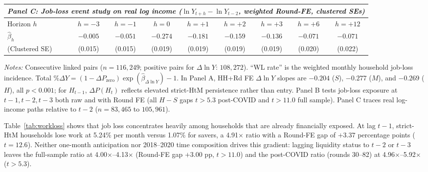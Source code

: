 \documentclass[11pt]{article}
\begin{document}
\begin{table}[tbp]
\medskip
\setlength{\tabcolsep}{4.0pt}
\begin{tabular}{lcccccccc}
\toprule
\multicolumn{9}{l}{\textit{Panel C: Job-loss event study on real log income ($\ln Y_{t+h} - \ln Y_{t-2}$, weighted Round-FE, clustered SEs)}} \\
\midrule
Horizon $h$ & $h=-3$ & $h=-1$ & $h=0$ & $h=+1$ & $h=+2$ & $h=+3$ & $h=+6$ & $h=+12$ \\
\midrule
$\hat{\beta}_h$ & $-0.005$ & $-0.051$ & $-0.274$ & $-0.181$ & $-0.159$ & $-0.136$ & $-0.071$ & $-0.071$ \\
(Clustered SE) & (0.015) & (0.015) & (0.019) & (0.019) & (0.019) & (0.019) & (0.020) & (0.022) \\
\bottomrule
\end{tabular}
\begin{flushleft}
\footnotesize\textit{Notes:} Consecutive linked pairs ($n = 116{,}249$; positive pairs for $\Delta \ln Y$: $108{,}272$). ``WL rate'' is the weighted monthly household job-loss incidence. Total $\% \Delta Y = (1 - \Delta P_{\text{zero}})\exp(\hat{\beta}_{\Delta \ln Y}) - 1$. In Panel A, HH+Rd FE $\Delta \ln Y$ slopes are $-0.204$ ($S$), $-0.277$ ($M$), and $-0.269$ ($H$), all $p < 0.001$; for $H_{t-1}$, $\Delta P(H_t)$ reflects elevated strict-HtM persistence rather than entry. Panel B tests job-loss exposure at $t-1, t-2, t-3$ both raw and with Round FE (all $H-S$ gaps $t > 5.3$ post-COVID and $t > 11.0$ full sample). Panel C traces real log-income paths relative to $t-2$ ($n = 83{,}465$ to $105{,}961$).
\end{flushleft}
\end{table}

Table~\ref{tab:workloss} shows that job loss concentrates heavily among households that are already financially exposed. At lag $t-1$, strict-HtM households lose work at 5.24\% per month versus 1.07\% for savers, a 4.91$\times$ ratio with a Round-FE gap of $+3.37$ percentage points ($t = 12.6$). Neither one-month anticipation nor 2018--2020 time composition drives this gradient: lagging liquidity status to $t-2$ or $t-3$ leaves the full-sample ratio at 4.00$\times$--4.13$\times$ (Round-FE gap $+3.00$ pp, $t > 11.0$) and the post-COVID ratio (rounds 30--82) at 4.96$\times$--5.92$\times$ ($t > 5.3$).
\end{document}
